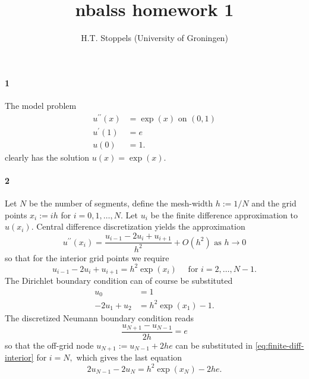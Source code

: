 \documentclass[a4paper]{article}
\author{H.T. Stoppels (University of Groningen)}
\title{{\sc nbalss} homework 1}
\begin{document}
  \maketitle
  
  \paragraph{1} The model problem
  \begin{equation*}
  \begin{aligned}
    u^{\prime\prime}(x) &= \exp(x) \text{ on } (0, 1) \\
    u^\prime(1) &= e \\
    u(0) &= 1.
  \end{aligned}
  \end{equation*}
  clearly has the solution $u(x) = \exp(x).$

  \paragraph{2} Let $N$ be the number of segments, define the mesh-width $h := 1/N$ and the grid points $x_i := ih$ for $i = 0, 1, \dots, N.$ Let $u_i$ be the finite difference approximation to $u(x_i).$ Central difference discretization yields the approximation
  \begin{equation}\label{eq:local_approx}
    u^{\prime\prime}(x_i) = \frac{u_{i - 1} - 2u_i + u_{i+1}}{h^2} + O(h^2) \text{ as } h \to 0
  \end{equation}
  so that for the interior grid points we require
  \begin{equation}\label{eq:finite-diff-interior}
    u_{i-1} - 2u_i + u_{i+1} = h^2 \exp(x_i) \quad \text{ for } i = 2, \dots, N - 1.
  \end{equation}
  The Dirichlet boundary condition can of course be substituted
  \begin{equation}\label{eq:finite-diff-dirichlet}
  \begin{aligned}
    u_0 &= 1 \\
    -2u_1 + u_2 &= h^2 \exp(x_1) - 1.
  \end{aligned}
  \end{equation}
  The discretized Neumann boundary condition reads $$\frac{u_{N+1} - u_{N-1}}{2h} = e$$ so that the off-grid node $u_{N+1} := u_{N-1} + 2he$ can be substituted in \eqref{eq:finite-diff-interior} for $i = N,$ which gives the last equation
  \begin{equation}\label{eq:finite-diff-neumann}
    2u_{N - 1} - 2u_N = h^2\exp(x_N) - 2he.
  \end{equation}
\end{document}
